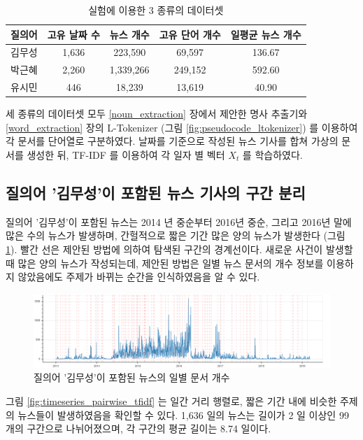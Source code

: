 \documentclass[oneside, ko,phd]{snuthesis_utf8_kor}
\begin{document}
\begin{table}[H]
\centering
\caption{실험에 이용한 3 종류의 데이터셋}
\label{tab:timeseries_dataset}
\begin{tabular}{|c|c|c|c|c|}
\hline
질의어 & 고유 날짜 수 & 뉴스 개수 & 고유 단어 개수 & 일평균 뉴스 개수 \\ \hline
김무성 & 1,636 & 223,590 & 69,597 & 136.67 \\ \hline
박근혜 & 2,260 & 1,339,266 & 249,152 & 592.60 \\ \hline
유시민 & 446 & 18,239 & 13,619 & 40.90 \\ \hline
\end{tabular}
\end{table}

세 종류의 데이터셋 모두 \ref{noun_extraction} 장에서 제안한 명사 추출기와 \ref{word_extraction} 장의 L-Tokenizer (그림 \ref{fig:pseudocode_ltokenizer}) 를 이용하여 각 문서를 단어열로 구분하였다.
날짜를 기준으로 작성된 뉴스 기사를 합쳐 가상의 문서를 생성한 뒤, TF-IDF 를 이용하여 각 일자 별 벡터 $X_t$ 를 학습하였다.

\subsection{질의어 '김무성'이 포함된 뉴스 기사의 구간 분리}

질의어 '김무성'이 포함된 뉴스는 2014 년 중순부터 2016년 중순, 그리고 2016년 말에 많은 수의 뉴스가 발생하며, 간헐적으로 짧은 기간 많은 양의 뉴스가 발생한다 (그림 \ref{fig:timeseries_kim_num_docs}).
빨간 선은 제안된 방법에 의하여 탐색된 구간의 경계선이다.
새로운 사건이 발생할 때 많은 양의 뉴스가 작성되는데, 제안된 방법은 일별 뉴스 문서의 개수 정보를 이용하지 않았음에도 주제가 바뀌는 순간을 인식하였음을 알 수 있다.

\begin{figure}[H]
\centering
\includegraphics[keepaspectratio=true, width=0.9\linewidth]{fig/timeseries_kim_num_docs.png}
\caption{질의어 '김무성'이 포함된 뉴스의 일별 문서 개수}
\label{fig:timeseries_kim_num_docs}
\end{figure}

그림 \ref{fig:timeseries_pairwise_tfidf} 는 일간 거리 행렬로, 짧은 기간 내에 비슷한 주제의 뉴스들이 발생하였음을 확인할 수 있다.
1,636 일의 뉴스는 길이가 2 일 이상인 99 개의 구간으로 나뉘어졌으며, 각 구간의 평균 길이는 8.74 일이다.
\end{document}
